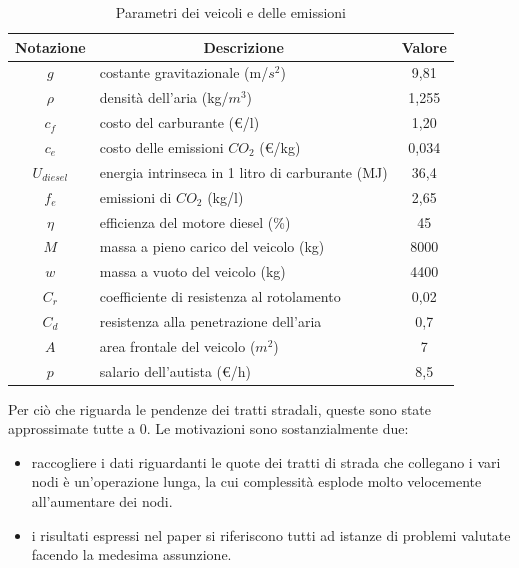 		\begin{table}[]
		\centering
		\caption{Parametri dei veicoli e delle emissioni}
		\label{table:parametri statici}
			\begin{tabular}{@{}clc@{}}
				\toprule
				Notazione    & \multicolumn{1}{c}{Descrizione}                  & Valore \\ \midrule
				$g$          & costante gravitazionale (m/$s^2$)                & 9,81   \\
				$\rho$       & densità dell'aria (kg/$m^3$)                     & 1,255  \\
				$c_f$        & costo del carburante (€/l)                       & 1,20   \\
				$c_e$        & costo delle emissioni $CO_2$ (€/kg)              & 0,034  \\
				$U_{diesel}$ & energia intrinseca in 1 litro di carburante (MJ) & 36,4   \\
				$f_e$        & emissioni di $CO_2$ (kg/l)                       & 2,65   \\
				$\eta$       & efficienza del motore diesel (\%)                & 45     \\
				$M$          & massa a pieno carico del veicolo (kg)            & 8000   \\
				$w$          & massa a vuoto del veicolo (kg)                   & 4400   \\
				$C_r$        & coefficiente di resistenza al rotolamento        & 0,02   \\
				$C_d$        & resistenza alla penetrazione dell'aria           & 0,7    \\
				$A$          & area frontale del veicolo ($m^2$)                & 7      \\
				$p$          & salario dell'autista (€/h)                       & 8,5    \\ \bottomrule
			\end{tabular}
		\end{table}

		Per ciò che riguarda le pendenze dei tratti stradali, queste sono state approssimate tutte a 0.
		Le motivazioni sono sostanzialmente due:

		\begin{itemize}
			\item raccogliere i dati riguardanti le quote dei tratti di strada che collegano i vari nodi è un’operazione lunga, la cui complessità esplode molto velocemente all’aumentare dei nodi.
			\item i risultati espressi nel paper \cite{Laporte11} si riferiscono tutti ad istanze di problemi valutate facendo la medesima assunzione.
		\end{itemize}

